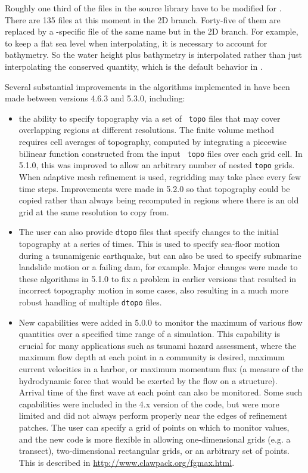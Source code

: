 Roughly one third of the files in the \amrclaw source library
have to be modified for \geoclaw. 
There are 135 files at this moment 
in the \amrclaw 2D branch.
Forty-five of them are replaced by a \geoclaw-specific file of the
same name but in the \geoclaw 2D branch. 
For example, to keep a flat
sea level when interpolating, it is necessary to account for bathymetry.
So the water height plus bathymetry is interpolated rather than just
interpolating the conserved quantity, which is the default behavior in
\amrclaw.

Several substantial improvements in the
algorithms implemented in \geoclaw have been made between versions 4.6.3 and
5.3.0, including:

\begin{itemize} 
\item the ability to specify topography via a set of {\tt
topo} files that may cover overlapping regions at different resolutions. The
finite volume method requires cell averages of topography, computed by
integrating a piecewise bilinear function constructed from the input {\tt
topo} files over each grid cell.  In 5.1.0, this was improved to 
allow an arbitrary number of nested {\tt topo} grids.
When adaptive mesh refinement is used,
regridding may take place every few time steps.  Improvements were made 
in 5.2.0 so that topography could be copied rather than always being
recomputed in regions where there is an old grid at the same resolution to
copy from.  

\item The user can also provide {\tt dtopo} files that specify changes to the
initial topography at a series of times.  This is used to specify sea-floor
motion during a tsunamigenic earthquake, but can also be used to specify
submarine landslide motion or a failing dam, for example. Major changes were
made to these algorithms in 5.1.0 to fix a problem in earlier versions that
resulted in incorrect topography motion in some cases, also resulting in a much
more robust handling of multiple  {\tt dtopo} files.

\item New capabilities were added in 5.0.0 to monitor the maximum of various
flow quantities over a specified time range of a simulation.  This capability is
crucial for many applications such as tsunami hazard assessment, where the
maximum flow depth at each point in a community is desired, maximum current
velocities in a harbor, or maximum momentum flux (a measure of the hydrodynamic
force that would be exerted by the flow on a structure).  Arrival time of the
first wave at each point can also be monitored.  Some such capabilities were
included in the 4.x version of the code, but were more limited and did not
always perform properly near the edges of refinement patches.  The user can
specify a grid of points on which to monitor values, and the new code is more
flexible in allowing one-dimensional grids (e.g. a transect), two-dimensional
rectangular grids, or an arbitrary set of points.
This is described in 
\url{http://www.clawpack.org/fgmax.html}.


\end{itemize}
